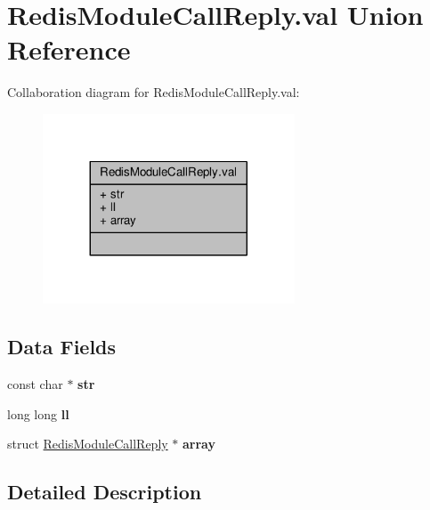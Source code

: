 \hypertarget{unionRedisModuleCallReply_8val}{}\section{Redis\+Module\+Call\+Reply.\+val Union Reference}
\label{unionRedisModuleCallReply_8val}


Collaboration diagram for Redis\+Module\+Call\+Reply.\+val\+:\nopagebreak
\begin{figure}[H]
\begin{center}
\leavevmode
\includegraphics[width=212pt]{unionRedisModuleCallReply_8val__coll__graph}
\end{center}
\end{figure}
\subsection*{Data Fields}
\begin{DoxyCompactItemize}
\item 
\mbox{\label{unionRedisModuleCallReply_8val_a341be97d9aff90c9978347f66f945b77}} 
const char $\ast$ {\bfseries str}
\item 
\mbox{\label{unionRedisModuleCallReply_8val_a5b54c0a045f179bcbbbc9abcb8b5cd4c}} 
long long {\bfseries ll}
\item 
\mbox{\label{unionRedisModuleCallReply_8val_af1f713c9e000f5d3f280adbd124df4f5}} 
struct \hyperlink{structRedisModuleCallReply}{Redis\+Module\+Call\+Reply} $\ast$ {\bfseries array}
\end{DoxyCompactItemize}


\subsection{Detailed Description}


